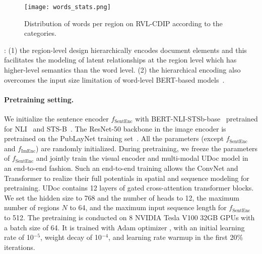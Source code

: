 \documentclass{article}
\begin{document}
	\begin{wrapfigure}{r}{0.5\textwidth}
		\vspace{-4mm}
		\centering
		\small
		\begin{center}
			\texttt{[image: words\_stats.png]}
			\vspace{-3mm}
			\caption{Distribution of words per region on RVL-CDIP according to the categories.}\label{fig:dist_wordregion}
		\end{center}
		\vspace{-7mm}
	\end{wrapfigure}
	: (1) {the} region-level design {hierarchically encodes document elements} {and this facilitates the modeling of latent relationships at the region level which has higher-level semantics than the word level.}
	(2) {the hierarchical encoding} {also} overcome{s} the input size limitation of {word-level} BERT-based models~\cite{xu2020layoutlm,xu2020layoutlmv2}.
	
	\paragraph{Pretraining setting.}
	We initialize the sentence encoder $f_{\text{SentEnc}}$ with BERT-NLI-STSb-base~\cite{reimers-2019-sentence-bert} pretrained for NLI~\cite{williams2017broad} and STS-B~\cite{cer2017semeval}.
	The ResNet-50 backbone in the image encoder is pretrained on the PubLayNet training set~\cite{zhong2019publaynet}.
	All the parameters (except $f_{\text{SentEnc}}$ and $f_{\text{ImEnc}}$) are randomly initialized. During pretraining, we freeze the parameter{s} of $f_{\text{SentEnc}}$ and jointly train the {visual encoder and multi-modal UDoc} model {in an end-to-end fashion}. Such {an} end-to-end training {allows the ConvNet and Transformer to realize their full potentials in spatial and sequence modeling for pretraining.}
	UDoc contains 12 layers {of} gated cross-attention transformer blocks. We set the hidden size to 768 and the number of heads to 12, {the maximum number of regions $N$ to 64, and the maximum input sequence length for $f_{\text{SentEnc}}$} to 512.
	The pretraining is conducted on 8 NVIDIA Tesla V100 32GB GPUs with a batch size of 64. {It is trained with} Adam optimizer \cite{kingma2014adam}, with an initial learning rate of 10$^{-5}$, weight decay of 10$^{-4}$, and {learning rate warmup in the} first 20\% {iterations.}
	
\end{document}
